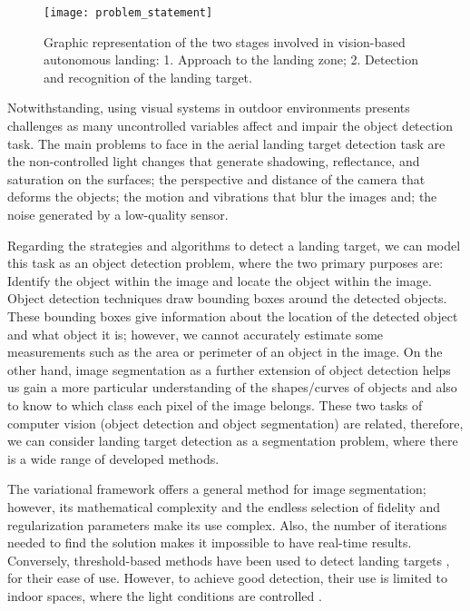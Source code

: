 \begin{figure}[!ht]
    \centering
    \texttt{[image: problem\_statement]}        
    \caption{Graphic representation of the two stages involved in vision-based autonomous landing: 1. Approach to the landing zone; 2. Detection and recognition of the landing target.}\label{fig:visionbased_landing_problem_sketch}
\end{figure}

Notwithstanding, using visual systems in outdoor environments presents challenges as many uncontrolled variables affect and impair the object detection task. The main problems to face in the aerial landing target detection task are the non-controlled light changes that generate shadowing, reflectance, and saturation on the surfaces; the perspective and distance of the camera that deforms the objects; the motion and vibrations that blur the images and; the noise generated by a low-quality sensor.

Regarding the strategies and algorithms to detect a landing target, we can model this task as an object detection problem, where the two primary purposes are: Identify the object within the image and locate the object within the image. Object detection techniques draw bounding boxes around the detected objects. These bounding boxes give information about the location of the detected object and what object it is; however, we cannot accurately estimate some measurements such as the area or perimeter of an object in the image. On the other hand, image segmentation as a further extension of object detection helps us gain a more particular understanding of the shapes/curves of objects and also to know to which class each pixel of the image belongs. These two tasks of computer vision (object detection and object segmentation) are related, therefore, we can consider landing target detection as a segmentation problem, where there is a wide range of developed methods.

The variational framework \citep{Mumford.Shah:CPAM:1989} offers a general method for image segmentation; however, its mathematical complexity and the endless selection of fidelity and regularization parameters make its use complex. Also, the number of iterations needed to find the solution makes it impossible to have real-time results. Conversely, threshold-based methods have been used to detect landing targets \citep{Lacroix.Caballero:IROS:2006}, \citep{Lange.Sunderhauf.ea:SIMPAR:2008} for their ease of use. However, to achieve good detection, their use is limited to indoor spaces, where the light conditions are controlled \citep{Araar.Aouf.ea:IROS:2017}. 

